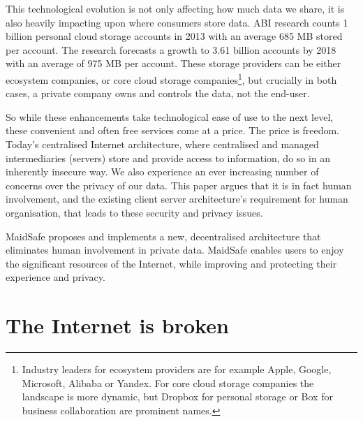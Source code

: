 \documentclass[twocolumn,english]{article}
\begin{document}
This technological evolution is not only affecting how much data we
share, it is also heavily impacting upon where consumers store data.
ABI research counts 1 billion personal cloud storage accounts in 2013 with an average 685 MB stored per account.  The research forecasts a growth to 3.61 billion accounts by 2018 with an average of 975 MB per account\cite{abi13}. %
These storage providers can be either ecosystem companies, or core cloud storage companies\footnote{Industry leaders for ecosystem providers are for example Apple, Google, Microsoft, Alibaba or Yandex. For core cloud storage companies the landscape is more dynamic, but Dropbox for personal storage or Box for business collaboration are prominent names.}, but crucially in both cases, a private company owns and controls the data, not the end-user.

So while these enhancements take technological ease of use to the next
level, these convenient and often free services come at a price. The
price is freedom. Today\textquoteright s centralised Internet architecture,
where centralised and managed intermediaries (servers) store and provide
access to information, do so in an inherently insecure way. We also
experience an ever increasing number of concerns over the privacy
of our data. This paper argues that it is in fact human involvement,
and the existing client server architecture\textquoteright s requirement
for human organisation, that leads to these security and privacy issues.

MaidSafe proposes and implements a new, decentralised architecture that eliminates human involvement in private data.  MaidSafe enables users to enjoy the significant resources of the Internet, while improving and protecting their experience and privacy.


\section{The Internet is broken}
\end{document}

